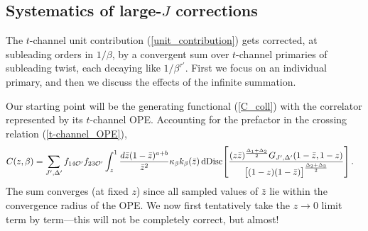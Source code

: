 \documentclass[11pt, reqno,preprint]{article}
\def\be{\begin{equation}}
\def\ee{\end{equation}}
\def\dDisc{{\rm dDisc}\,}
\def\OO{\mathcal{O}}
\def\zbar{\bar{z}}
\def\j{J}
\begin{document}
\subsection{Systematics of large-$\j$ corrections}

The $t$-channel unit contribution (\ref{unit_contribution})
gets corrected, at subleading orders in $1/\beta$, by a convergent sum over $t$-channel primaries of subleading twist,
each decaying like $1/\beta^{\tau'}$.
First we focus on an individual primary, and then we discuss the effects of the infinite summation.

Our starting point will be the generating functional (\ref{C_coll}) with the correlator represented by
its $t$-channel OPE. Accounting for the prefactor in the crossing relation (\ref{t-channel_OPE}),
\be\begin{aligned}
 C(z,\beta) &= \sum_{\j',\Delta'}f_{14\OO'}f_{23\OO'}
\int_z^1 \frac{d\zbar(1-\zbar)^{a+b}}{\zbar^2} \kappa_{\beta}k_{\beta}(\zbar) 
\,\dDisc\!\!\left[
\frac{(z\zbar)^{\frac{\Delta_1+\Delta_2}{2}}G_{\j',\Delta'}(1-\zbar,1-z)}{\big[(1-z)(1-\zbar)\big]^{\frac{\Delta_2+\Delta_3}{2}}}\right]. \label{t-channel-C}
\end{aligned}\ee
The sum converges (at fixed $z$) since all sampled values of $\zbar$ lie within the convergence radius of the OPE.
We now first tentatively take the $z\to 0$ limit term by term---this will not be completely correct, but almost!
\end{document}
